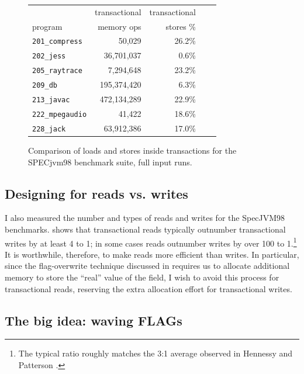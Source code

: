 \begin{figure}\sis%
\begin{center}
\begin{tabular}{lrrrr}
        & transactional & transactional\\
program & memory ops    & stores \% \\\hline
{\tt 201\_compress} & 50,029 & 26.2\% \\
{\tt 202\_jess} & 36,701,037 & 0.6\% \\
{\tt 205\_raytrace} & 7,294,648 & 23.2\% \\
{\tt 209\_db} & 195,374,420 & 6.3\% \\
{\tt 213\_javac} & 472,134,289 & 22.9\% \\
{\tt 222\_mpegaudio} & 41,422 & 18.6\% \\
{\tt 228\_jack} & 63,912,386 & 17.0\% \\
\end{tabular}
\end{center}
\caption{Comparison of loads and stores inside transactions for the
  SPECjvm98 benchmark suite, full input runs.}
\label{fig:writepercent}
\end{figure}
\subsection{Designing for reads vs. writes}
I also measured the number and types of reads and writes for the
SpecJVM98 benchmarks.
 shows that transactional reads typically
outnumber transactional writes by at least 4 to 1; in some cases reads
outnumber writes by over 100 to 1.\footnote{The typical ratio roughly
  matches the 3:1 average observed in Hennessy and Patterson
  \cite[pp. 105, 379]{HennessyPa96}.}  It is worthwhile, therefore, to
make reads more efficient than writes.  In particular, since the
flag-overwrite technique discussed in  requires us
to allocate additional memory to store the ``real'' value of the
field, I wish to avoid this process for transactional reads,
reserving the extra allocation effort for transactional writes.

\subsection{The big idea: waving FLAGs}\label{sec:flagfield}

